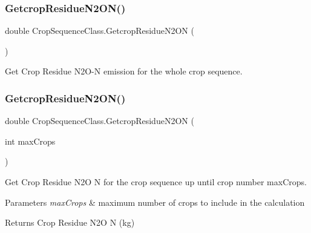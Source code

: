 \subsubsection{\texorpdfstring{GetcropResidueN2ON()}{GetcropResidueN2ON()}\hspace{0.1cm}{\footnotesize\ttfamily [1/2]}}
{\footnotesize\ttfamily double Crop\+Sequence\+Class.\+Getcrop\+Residue\+N2\+ON (\begin{DoxyParamCaption}{ }\end{DoxyParamCaption})\hspace{0.3cm}{\ttfamily [inline]}}



Get Crop Residue N2\+O-\/N emission for the whole crop sequence. 

\mbox{\label{class_crop_sequence_class_a692e23e3e0d64b9b5932cea101d1534b}} 
\subsubsection{\texorpdfstring{GetcropResidueN2ON()}{GetcropResidueN2ON()}\hspace{0.1cm}{\footnotesize\ttfamily [2/2]}}
{\footnotesize\ttfamily double Crop\+Sequence\+Class.\+Getcrop\+Residue\+N2\+ON (\begin{DoxyParamCaption}\item[{int}]{max\+Crops }\end{DoxyParamCaption})\hspace{0.3cm}{\ttfamily [inline]}}



Get Crop Residue N2O N for the crop sequence up until crop number max\+Crops. 


\begin{DoxyParams}{Parameters}
{\em max\+Crops} & maximum number of crops to include in the calculation \\
\hline
\end{DoxyParams}
\begin{DoxyReturn}{Returns}
Crop Residue N2O N (kg) 
\end{DoxyReturn}
\mbox{\label{class_crop_sequence_class_a63cacd0e3943bbd08128560ccd116b5d}} 
